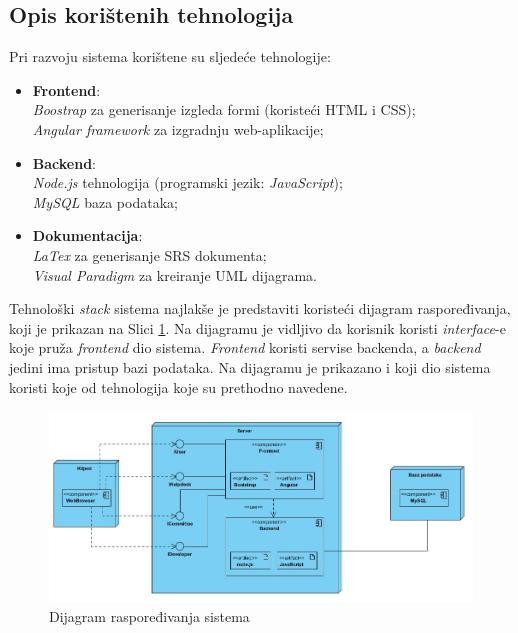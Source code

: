 \documentclass[12pt,a4paper]{article}
\begin{document}
\subsection{Opis korištenih tehnologija}

Pri razvoju sistema korištene su sljedeće tehnologije:

\begin{itemize}
\item \textbf{Frontend}: \\
\textit{Boostrap} za generisanje izgleda formi (koristeći HTML i CSS); \\
\textit{Angular framework} za izgradnju web-aplikacije;
\item \textbf{Backend}: \\
\textit{Node.js} tehnologija (programski jezik: \textit{JavaScript}); \\
\textit{MySQL} baza podataka;
\item \textbf{Dokumentacija}: \\
\textit{LaTex} za generisanje SRS dokumenta; \\
\textit{Visual Paradigm} za kreiranje UML dijagrama.
\end{itemize}

Tehnološki \textit{stack} sistema najlakše je predstaviti koristeći dijagram raspoređivanja, koji je prikazan na Slici \ref{deployment}. Na dijagramu je vidljivo da korisnik koristi \textit{interface}-e koje pruža \textit{frontend} dio sistema. \textit{Frontend} koristi servise backenda, a \textit{backend} jedini ima pristup bazi podataka. Na dijagramu je prikazano i koji dio sistema koristi koje od tehnologija koje su prethodno navedene.

\begin{figure}[H]
\center
\includegraphics[scale=0.55]{../res/deployment.JPG}
\caption{Dijagram raspoređivanja sistema}
\label{deployment}
\end{figure}
\end{document}
